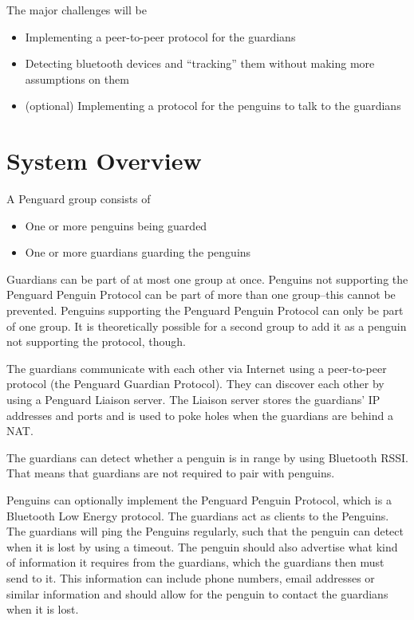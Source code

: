\documentclass{report}
\begin{document}
The major challenges will be

\begin{itemize}
    \item Implementing a peer-to-peer protocol for the guardians
    \item Detecting bluetooth devices and ``tracking'' them without making more assumptions on them
    \item (optional) Implementing a protocol for the penguins to talk to the guardians
\end{itemize}

\section{System Overview}

A Penguard group consists of

\begin{itemize}
    \item One or more penguins being guarded
    \item One or more guardians guarding the penguins
\end{itemize}

Guardians can be part of at most one group at once. Penguins not supporting the Penguard Penguin Protocol can be part of more than one group--this cannot be prevented. Penguins supporting the Penguard Penguin Protocol can only be part of one group. It is theoretically possible for a second group to add it as a penguin not supporting the protocol, though.

The guardians communicate with each other via Internet using a peer-to-peer protocol (the Penguard Guardian Protocol). They can discover each other by using a Penguard Liaison server. The Liaison server stores the guardians' IP addresses and ports and is used to poke holes when the guardians are behind a NAT.

The guardians can detect whether a penguin is in range by using Bluetooth RSSI. That means that guardians are not required to pair with penguins.

Penguins can optionally implement the Penguard Penguin Protocol, which is a Bluetooth Low Energy protocol. The guardians act as clients to the Penguins. The guardians will ping the Penguins regularly, such that the penguin can detect when it is lost by using a timeout. The penguin should also advertise what kind of information it requires from the guardians, which the guardians then must send to it. This information can include phone numbers, email addresses or similar information and should allow for the penguin to contact the guardians when it is lost.
\end{document}
